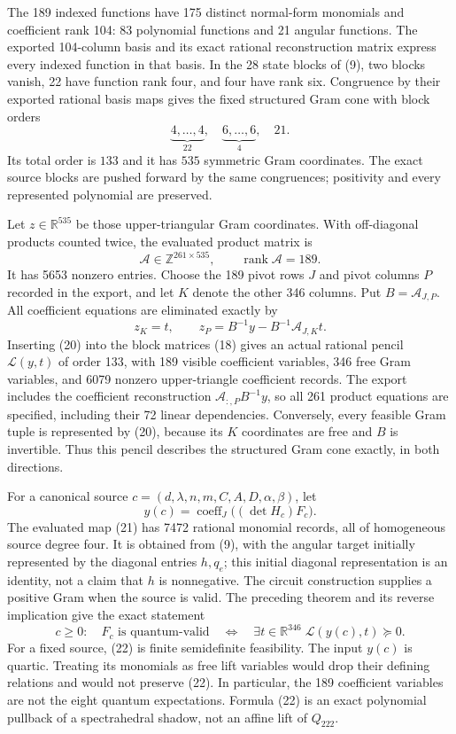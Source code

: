 \documentclass[11pt]{article}
\newcommand{\R}{\mathbb R}
\begin{document}
The 189 indexed functions have 175 distinct normal-form monomials and
coefficient rank 104: 83 polynomial functions and 21 angular functions.
The exported 104-column basis and its exact rational reconstruction
matrix express every indexed function in that basis.  In the 28 state
blocks of (9), two blocks vanish, 22 have function rank four, and four
have rank six.  Congruence by their exported rational basis maps gives
the fixed structured Gram cone with block orders
\[
       \underbrace{4,\ldots,4}_{22},\quad
       \underbrace{6,\ldots,6}_{4},\quad21.             \tag{18}
\]
Its total order is $133$ and it has $535$ symmetric Gram coordinates.
The exact source blocks are pushed forward by the same congruences;
positivity and every represented polynomial are preserved.

Let $z\in\R^{535}$ be those upper-triangular Gram coordinates.  With
off-diagonal products counted twice, the evaluated product matrix is
\[
       \mathcal A\in\mathbb Z^{261\times535},\qquad
       \operatorname{rank}\mathcal A=189.              \tag{19}
\]
It has 5653 nonzero entries.  Choose the 189 pivot rows $J$ and pivot
columns $P$ recorded in the export, and let $K$ denote the other 346
columns.  Put $B=\mathcal A_{J,P}$.  All coefficient equations are
eliminated exactly by
\[
 z_K=t,\qquad z_P=B^{-1}y-B^{-1}\mathcal A_{J,K}t.       \tag{20}
\]
Inserting (20) into the block matrices (18) gives an actual rational
pencil $\mathcal L(y,t)$ of order 133, with 189 visible coefficient
variables, 346 free Gram variables, and 6079 nonzero upper-triangle
coefficient records.  The export includes the coefficient reconstruction
$\mathcal A_{:,P}B^{-1}y$, so all 261 product equations are specified,
including their 72 linear dependencies.  Conversely, every feasible
Gram tuple is represented by (20), because its $K$ coordinates are free
and $B$ is invertible.  Thus this pencil describes the structured Gram
cone exactly, in both directions.

For a canonical source $c=(d,\lambda,n,m,C,A,D,\alpha,\beta)$, let
\[
 y(c)=\operatorname{coeff}_{J}\bigl((\det H_c)F_c\bigr).
                                                               \tag{21}
\]
The evaluated map (21) has 7472 rational monomial records, all of
homogeneous source degree four.  It is obtained from (9), with the
angular target initially represented by the diagonal entries $h,q_e$;
this initial diagonal representation is an identity, not a claim that
$h$ is nonnegative.  The circuit construction supplies a positive Gram
when the source is valid.  The preceding theorem and its reverse
implication give the exact statement
\[
\boxed{\quad c\geq0:\quad
 F_c\text{ is quantum-valid}\quad\Longleftrightarrow\quad
 \exists t\in\R^{346}\;\mathcal L(y(c),t)\succeq0.\quad}           \tag{22}
\]
For a fixed source, (22) is finite semidefinite feasibility.  The input
$y(c)$ is quartic.  Treating its monomials as free lift variables would
drop their defining relations and would not preserve (22).  In
particular, the 189 coefficient variables are not the eight quantum
expectations.  Formula (22) is an exact polynomial pullback of a
spectrahedral shadow, not an affine lift of $Q_{222}$.
\end{document}
